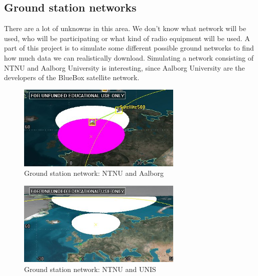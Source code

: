 \subsection{Ground station networks}

There are a lot of unknowns in this area. We don't know what network will be used, who will be participating or what kind of radio equipment will be used. A part of this project is to simulate some different possible ground networks to find how much data we can realistically download.  
Simulating a network consisting of NTNU and Aalborg University is interesting, since Aalborg University are the developers of the BlueBox satellite network. 

\begin{figure}
  \begin{center}
    \includegraphics[width=0.7\textwidth]{Figures/range_ntnu_aalborg}
  \end{center}
  \caption{Ground station network: NTNU and Aalborg}
  \label{fig:range_ntnu_aalborg}
\end{figure}

\begin{figure}
  \begin{center}
    \includegraphics[width=0.7\textwidth]{Figures/range_ntnu_svalbard}
  \end{center}
  \caption{Ground station network: NTNU and UNIS}
  \label{fig:range_ntnu_unis}
\end{figure}

